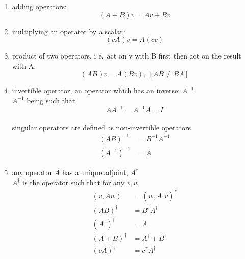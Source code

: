 \documentclass[a4paper,11pt,normalem]{article}
\begin{document}
\begin{enumerate}
\item
  adding operators:
\[
    (A + B)v = Av + Bv
\]
\item
  multiplying an operator by a scalar:
\[
    (cA)v = A(cv)
\]
\item
  product of two operators, i.e.~act on v with B first then act on the
  result with A:
\[
    (AB)v = A(Bv), ~ [AB \neq BA]
\]
\item
  invertible operator, an operator which has an inverse: \(A^{-1}\)\\
  \(A^{-1}\) being such that \[AA^{-1} = A^{-1}A = I\]\\
  singular operators are defined as non-invertible operators \[
  \begin{aligned}
  (AB)^{-1} &= B^{-1}A^{-1} \\
  (A^{-1})^{-1} &= A
  \end{aligned}
  \]
\item
  any operator \(A\) has a unique adjoint, \(A^\dagger\)\\
  \(A^\dagger\) is the operator such that for any \(v,w\) \[
  \begin{aligned}
  (v,Aw) &= (w,A^\dagger v)^* \\
  (AB)^\dagger &= B^\dagger A^\dagger \\
  (A^\dagger)^\dagger &= A \\
  (A + B)^\dagger &= A^\dagger + B^\dagger \\
  (cA)^\dagger &= c^* A^\dagger
  \end{aligned}
  \]
\end{enumerate}
\end{document}
